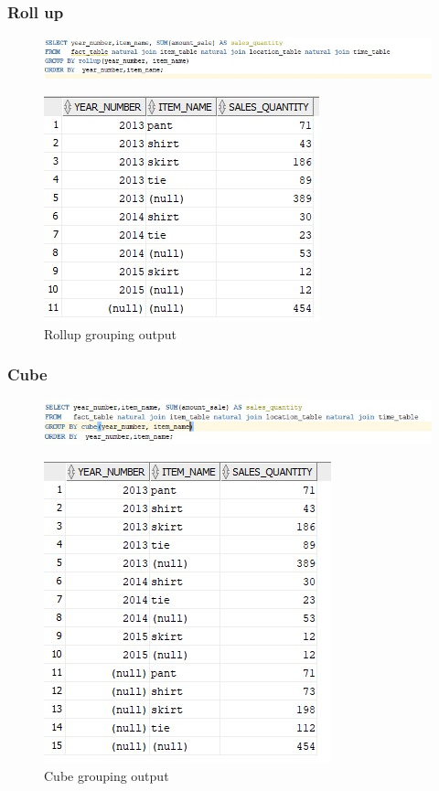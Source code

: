 \documentclass[12pt]{article}
\begin{document}
\subsubsection*{Roll up}
\begin{figure}[H]
	\centering
	\includegraphics[]{rollup-code.jpg}
\end{figure}
\begin{figure}[h!]
	\centering
	\includegraphics[]{rollup.jpg}
	\caption{Rollup grouping output}
\end{figure}

\subsubsection*{Cube}

\begin{figure}[h!]
	\centering
	\includegraphics[]{cube-code.jpg}
\end{figure}

\begin{figure}[H]
	\centering
	\includegraphics[]{cube.jpg}
	\caption{Cube grouping output}
\end{figure}
\end{document}
